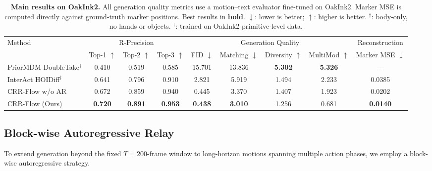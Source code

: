 \documentclass[sigconf, screen, review, anonymous]{acmart}
\begin{document}
\begin{table}[t]
  \caption{\textbf{Main results on OakInk2.}
  All generation quality metrics use a motion--text evaluator fine-tuned on OakInk2.
  Marker MSE is computed directly against ground-truth marker positions.
  Best results in \textbf{bold}.
  $\downarrow$: lower is better; $\uparrow$: higher is better.
  $^\dagger$: body-only, no hands or objects.
  $^\ddagger$: trained on OakInk2 primitive-level data.}
  \label{tab:main_oakink2}
  \centering
  \small
  \begin{tabular}{@{}l|ccc|cccc|c@{}}
    \toprule
    \multirow{2}{*}{Method} & \multicolumn{3}{c|}{R-Precision} & \multicolumn{4}{c|}{Generation Quality} & Reconstruction \\
    & Top-1 $\uparrow$ & Top-2 $\uparrow$ & Top-3 $\uparrow$ & FID $\downarrow$ & Matching $\downarrow$ & Diversity $\uparrow$  & MultiMod $\uparrow$ & Marker MSE $\downarrow$ \\
    \midrule
    PriorMDM DoubleTake$^\dagger$& 0.410 & 0.519 & 0.585 & 15.701 & 13.836 & \textbf{5.302}  & \textbf{5.326} & --- \\
    InterAct HOIDiff$^\ddagger$ & 0.641 & 0.796 & 0.910 & 2.821 & 5.919 & 1.494  & 2.233 & 0.0385 \\
    \midrule
    CRR-Flow w/o AR & 0.672 & 0.859 & 0.940 & 0.445 & 3.370& 1.407  & 1.923 & 0.0202 \\
    CRR-Flow (Ours) & \textbf{0.720} & \textbf{0.891} & \textbf{0.953}& \textbf{0.438} & \textbf{3.010} & 1.256  & 0.681 & \textbf{0.0140} \\
    \bottomrule
  \end{tabular}
\end{table}



\subsection{Block-wise Autoregressive Relay}
\label{sec:autoreg}

To extend generation beyond the fixed $T{=}200$-frame window to long-horizon motions spanning multiple action phases, we employ a block-wise autoregressive strategy.
\end{document}
